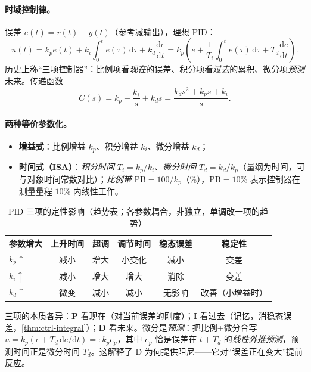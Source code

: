 \paragraph{时域控制律。}
误差 $e(t)=r(t)-y(t)$（参考减输出），理想 PID\cite{astrom2008feedback}：
\begin{equation}
  u(t)=k_pe(t)+k_i\int_0^t e(\tau)\,\mathrm d\tau+k_d\frac{\mathrm de}{\mathrm dt}
       =k_p\!\left(e+\frac{1}{T_i}\int_0^t e(\tau)\,\mathrm d\tau+T_d\frac{\mathrm de}{\mathrm dt}\right).
  \label{eq:ctrl-pid-two}
\end{equation}
历史上称“三项控制器”：比例项看\emph{现在}的误差、积分项看\emph{过去}的累积、微分项\emph{预测}未来。传递函数
\begin{equation}
  C(s)=k_p+\frac{k_i}{s}+k_ds=\frac{k_ds^2+k_ps+k_i}{s}.
  \label{eq:ctrl-pid-tf}
\end{equation}

\paragraph{两种等价参数化。}
\begin{itemize}
  \item \textbf{增益式}：比例增益 $k_p$、积分增益 $k_i$、微分增益 $k_d$；
  \item \textbf{时间式（ISA）}：\emph{积分时间} $T_i=k_p/k_i$、\emph{微分时间} $T_d=k_d/k_p$（量纲为时间，可与对象时间常数对比）；\emph{比例带} $\mathrm{PB}=100/k_p$（\%），$\mathrm{PB}=10\%$ 表示控制器在测量量程 $10\%$ 内线性工作。
\end{itemize}

\begin{table}[H]\centering\small
\caption{PID 三项的定性影响（趋势表；各参数耦合，非独立，单调改一项的趋势）}
\label{tab:ctrl-pid-effect}
\begin{tabular}{lccccc}
\toprule
参数增大 & 上升时间 & 超调 & 调节时间 & 稳态误差 & 稳定性 \\
\midrule
$k_p\uparrow$ & 减小 & 增大 & 小变化 & 减小 & 变差 \\
$k_i\uparrow$ & 减小 & 增大 & 增大 & 消除 & 变差 \\
$k_d\uparrow$ & 微变 & 减小 & 减小 & 无影响 & 改善（小增益时） \\
\bottomrule
\end{tabular}
\end{table}

\begin{insight}
三项的本质各异：\textbf{P} 看现在（对当前误差的刚度）；\textbf{I} 看过去（记忆，消稳态误差，\cref{thm:ctrl-integral}）；\textbf{D} 看未来。微分是\emph{预测}：把比例+微分合写 $u=k_p(e+T_d\,\mathrm de/\mathrm dt)=:k_pe_p$，其中 $e_p$ 恰是误差在 $t+T_d$ 的\emph{线性外推预测}，预测时间正是微分时间 $T_d$。这解释了 D 为何提供阻尼——它对“误差正在变大”提前反应。
\end{insight}

